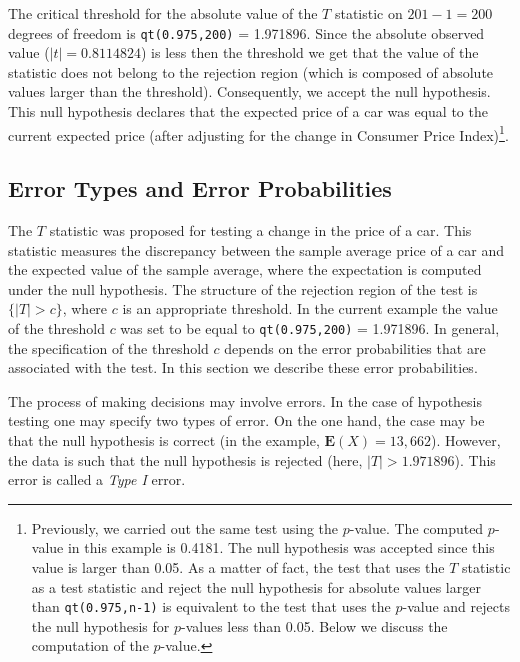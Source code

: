 \documentclass[
]{krantz}
\newcommand{\Expec}{\mathbf{E}}
\theoremstyle{definition}
\theoremstyle{definition}
\theoremstyle{definition}
\theoremstyle{remark}
\begin{document}
The critical threshold for the absolute value of the \(T\) statistic on
\(201-1 = 200\) degrees of freedom is \texttt{qt(0.975,200)} = 1.971896. Since
the absolute observed value (\(|t| = 0.8114824\)) is less then the
threshold we get that the value of the statistic does not belong to the
rejection region (which is composed of absolute values larger than the
threshold). Consequently, we accept the null hypothesis. This null
hypothesis declares that the expected price of a car was equal to the
current expected price (after adjusting for the change in Consumer Price
Index)\footnote{Previously, we carried out the same test using the \(p\)-value. The
  computed \(p\)-value in this example is 0.4181. The null hypothesis
  was accepted since this value is larger than 0.05. As a matter of
  fact, the test that uses the \(T\) statistic as a test statistic and
  reject the null hypothesis for absolute values larger than
  \texttt{qt(0.975,n-1)} is equivalent to the test that uses the \(p\)-value
  and rejects the null hypothesis for \(p\)-values less than 0.05. Below
  we discuss the computation of the \(p\)-value.}.

\hypertarget{error-types-and-error-probabilities}{%
\subsection{Error Types and Error Probabilities}\label{error-types-and-error-probabilities}}

The \(T\) statistic was proposed for testing a change in the price of a
car. This statistic measures the discrepancy between the sample average
price of a car and the expected value of the sample average, where the
expectation is computed under the null hypothesis. The structure of the
rejection region of the test is \(\{|T| > c\}\), where \(c\) is an
appropriate threshold. In the current example the value of the threshold
\(c\) was set to be equal to \texttt{qt(0.975,200)} = 1.971896. In general, the
specification of the threshold \(c\) depends on the error probabilities
that are associated with the test. In this section we describe these
error probabilities.

The process of making decisions may involve errors. In the case of
hypothesis testing one may specify two types of error. On the one hand,
the case may be that the null hypothesis is correct (in the example,
\(\Expec(X) = 13,662\)). However, the data is such that the null
hypothesis is rejected (here, \(|T| > 1.971896\)). This error is called a
\emph{Type I} error.
\end{document}
